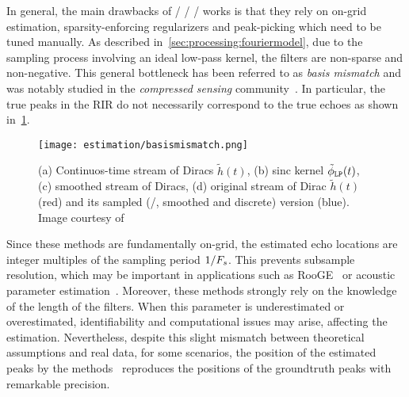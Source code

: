 \mynewline
In general, the main drawbacks of \FIR/ \SIMO/ \BCE/ works is that they rely on on-grid estimation, sparsity-enforcing regularizers and peak-picking which need to be tuned manually.
As described in~\cref{sec:processing:fouriermodel}, due to the sampling process involving an ideal low-pass kernel, the filters are non-sparse and non-negative.
This general bottleneck has been referred to as \textit{basis mismatch} and was notably studied in the \textit{compressed sensing} community~.
In particular, the true peaks in the \ac{RIR} do not necessarily correspond to the true echoes as shown in~\cref{fig:estimation:mismatch}.
\begin{figure}[h]
    \begin{fullwidth}
        \centering
        \texttt{[image: estimation/basismismatch.png]}
        \caption{%
        (a) Continuos-time stream of Diracs $\tilde{h}(t)$,
        (b) sinc kernel $\lowpassfilter(t)$,
        (c) smoothed stream of Diracs,
        (d) original stream of Dirac $\tilde{h}(t)$ (red) and its sampled (\ie/, smoothed and discrete) version (blue).
        Image courtesy of~
        }
        \label{fig:estimation:mismatch}
    \end{fullwidth}
\end{figure}
Since these methods are fundamentally on-grid, the estimated echo locations are integer multiples of the sampling period $1/F_s$.
This prevents subsample resolution, which may be important in applications such as \ac{RooGE}~ or acoustic parameter estimation~.
Moreover, these methods strongly rely on the knowledge of the length of the filters.
When this parameter is underestimated or overestimated, identifiability and computational issues may arise, affecting the estimation.
Nevertheless, despite this slight mismatch between theoretical assumptions and real data, for some scenarios, the position of the estimated peaks by the methods~ reproduces the positions of the groundtruth peaks with remarkable precision.

